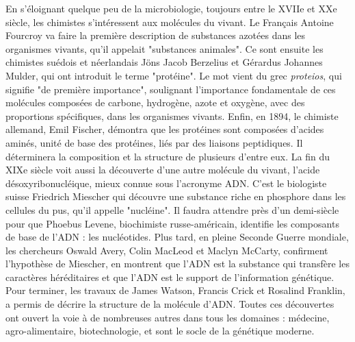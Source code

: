 En s'éloignant quelque peu de la microbiologie, toujours entre le XVIIe et XXe siècle, les chimistes s'intéressent aux molécules du vivant. Le Français Antoine Fourcroy va faire la première description de substances azotées dans les organismes vivants, qu'il appelait "substances animales". Ce sont ensuite les chimistes suédois et néerlandais Jöns Jacob Berzelius et Gérardus Johannes Mulder, qui ont introduit le terme "protéine". Le mot vient du grec \textit{proteios}, qui signifie "de première importance", soulignant l'importance fondamentale de ces molécules composées de carbone, hydrogène, azote et oxygène, avec des proportions spécifiques, dans les organismes vivants. Enfin, en 1894, le chimiste allemand, Emil Fischer, démontra que les protéines sont composées d'acides aminés, unité de base des protéines, liés par des liaisons peptidiques. Il déterminera la composition et la structure de plusieurs d'entre eux. La fin du XIXe siècle voit aussi la découverte d'une autre molécule du vivant, l'acide désoxyribonucléique, mieux connue sous l'acronyme ADN. C'est le biologiste suisse Friedrich Miescher qui découvre une substance riche en phosphore dans les cellules du pus, qu'il appelle "nucléine". Il faudra attendre près d'un demi-siècle pour que Phoebus Levene, biochimiste russe-américain, identifie les composants de base de l'ADN : les nucléotides. Plus tard, en pleine Seconde Guerre mondiale, les chercheurs Oswald Avery, Colin MacLeod et Maclyn McCarty, confirment l'hypothèse de Miescher, en montrent que l’ADN est la substance qui transfère les caractères héréditaires et que l'ADN est le support de l’information génétique. Pour terminer, les travaux de James Watson, Francis Crick  et Rosalind Franklin, a permis de décrire la structure de la molécule d'ADN. Toutes ces découvertes ont ouvert la voie à de nombreuses autres dans tous les domaines : médecine, agro-alimentaire, biotechnologie, et sont le socle de la génétique moderne.


